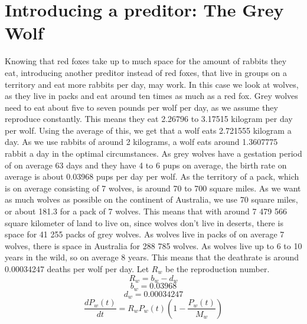 \documentclass{article}
\begin{document}
\section{Introducing a preditor: The Grey Wolf}
Knowing that red foxes take up to much space for the amount of rabbits they eat, introducing another preditor instead of red foxes, that live in groups on a territory and eat more rabbits per day, may work. In this case we look at wolves, as they live in packs and eat around ten times as much as a red fox. Grey wolves need to eat about five to seven pounds per wolf per day, as we assume they reproduce constantly.\cite{WolfFood} This means they eat 2.26796 to 3.17515 kilogram per day per wolf. Using the average of this, we get that a wolf eats 2.721555 kilogram a day. As we use rabbits of around 2 kilograms, a wolf eats around 1.3607775 rabbit a day in the optimal circumstances. As grey wolves have a gestation period of on average 63 days  and they have 4 to 6 pups on average, the birth rate on average is about 0.03968 pups per day per wolf.\cite{WolfRepLifeTer} As the territory of a pack, which is on average consisting of 7 wolves, is around 70 to 700 square miles.\cite{WolfRepLifeTer} As we want as much wolves as possible on the continent of Australia, we use 70 square miles, or about 181.3 for a pack of 7 wolves. This means that with around 7 479 566 square kilometer of land to live on, since wolves don't live in deserts, there is space for 41 255 packs of grey wolves. As wolves live in packs of on average 7 wolves, there is space in Australia for 288 785 wolves.\cite{WolfRepLifeTer} As wolves live up to 6 to 10 years in the wild, so on average 8 years.\cite{WolfRepLifeTer} This means that the deathrate is around 0.00034247 deaths per wolf per day. 
Let $R_w$ be the reproduction number.
$$R_w = b_w - d_w$$
$$b_w = 0.03968$$
$$d_w = 0.00034247$$
$$\frac{dP_w(t)}{dt} = R_wP_w(t)(1-\frac{P_w(t)}{M_w})$$
\end{document}
